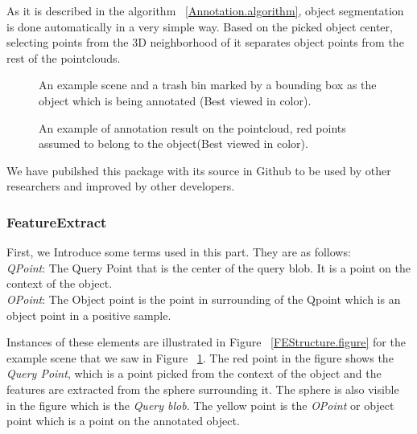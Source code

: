 As it is described in the algorithm ~\ref{Annotation.algorithm}, object segmentation is done automatically in a very 
simple way. Based on the picked object center, selecting points from the 3D neighborhood of it separates object points from the 
rest of the pointclouds.

\begin{figure}[t]
  \caption[Example scene and object for Annotation tool]
  {An example scene and a trash bin marked by a bounding box as the object which is being annotated (Best viewed in color).}
  \label{TrashbinBounding.figure}
\end{figure}

\begin{figure}[t]
  \caption[Annotation tool result]
  {An example of annotation result on the pointcloud, red points assumed to belong to the object(Best viewed in color).}
  \label{Annotation.figure}
\end{figure}

We have pubilshed this package with its source in Github to be used by other researchers and improved by other developers.\cite{AnnotationGithub}


\subsubsection{FeatureExtract}
\label{FeatureExtract.ssec}
First, we Introduce some terms used in this part. They are as follows:
\\
  {\it QPoint}: The Query Point that is the center of the query blob. It is a point on the context of the object.
  \\
  {\it OPoint}: The Object point is the point in surrounding of the Qpoint which is an object point in a positive sample.
 
 Instances of these elements are illustrated in Figure ~\ref{FEStructure.figure} for the example scene that we saw in Figure 
 ~\ref{TrashbinBounding.figure}. 
 The red point in the figure shows the {\it Query Point}, which is a point picked from the context of the object and the features are extracted from the sphere surrounding it. The sphere is also visible in the figure which is the 
{\it Query blob}. 
 The yellow point is the {\it OPoint} or object point which is a point on the annotated object. 
 

